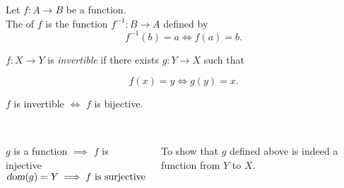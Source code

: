 
\begin{frame}{}
  \begin{center}
  \end{center}

\end{frame}

\begin{frame}{}
  \begin{definition}[Inverse]
    Let $f: A \to B$ be a  function. \\[5pt]

    The  of $f$ is the function $f^{-1}: B \to A$ defined by
    \[
      f^{-1}(b) = a \iff f(a) = b.
    \]
  \end{definition}

  \pause
\end{frame}

\begin{frame}{}
  \begin{definition}[Invertible]
    $f: X \to Y$ is {\it invertible} if there exists $g: Y \to X$ such that

    \[
      f(x) = y \iff g(y) = x.
    \]
  \end{definition}

  \pause
  \begin{theorem}
    $f$ is invertible $\iff$ $f$ is bijective.
  \end{theorem}

  \begin{columns}
      \pause
      \begin{center}
	 \pause \\[10pt]
	$g$ is a function $\implies$ $f$ is injective \\[5pt]
	$\textsl{dom}(g) = Y \implies f \text{ is surjective}$
      \end{center}
      \pause
      \begin{center}
	 \pause \\[10pt]
	To show that $g$ defined above is indeed a function from $Y$ to $X$.
      \end{center}
  \end{columns}
\end{frame}

